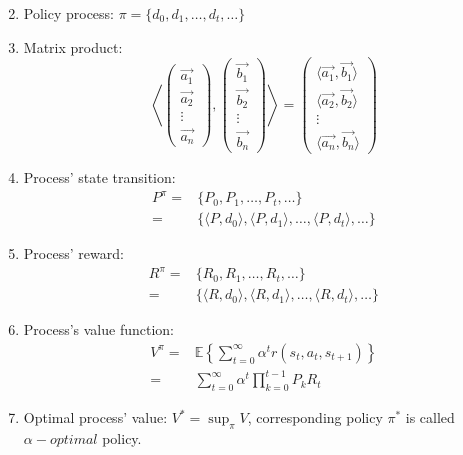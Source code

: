 \documentclass[a4paper]{article}
\numberwithin{figure}{section}
\numberwithin{equation}{section}
\begin{document}
\begin{enumerate}
\[        \]
    \item Policy process: $ \pi = \{ d_0, d_1, \ldots, d_t, \ldots \} $ 
    \item Matrix product:
        \[
            \left\langle 
                \begin{pmatrix}
                    \vec{a_1} \\
                    \vec{a_2} \\
                    \vdots \\
                    \vec{a_n}
                \end{pmatrix},
                \begin{pmatrix}
                    \vec{b_1} \\
                    \vec{b_2} \\
                    \vdots \\
                    \vec{b_n}
                \end{pmatrix}
            \right\rangle
            =
            \begin{pmatrix}
                \langle \vec{a_1}, \vec{b_1} \rangle \\
                \langle \vec{a_2}, \vec{b_2} \rangle \\
                \vdots \\
                \langle \vec{a_n}, \vec{b_n} \rangle
            \end{pmatrix}
        \]

    \item Process' state transition: 
        \begin{align*}
            P^{\pi} =& \{ P_0, P_1, \ldots, P_t, \ldots \} \\
            =& \{ \langle P, d_0 \rangle, \langle P, d_1 \rangle, \ldots, \langle P, d_t \rangle, \ldots \}
        \end{align*}
    \item Process' reward:
        \begin{align*}
            R^{\pi} =& \{ R_0, R_1, \ldots, R_t, \ldots \} \\
            =& \{ \langle R, d_0 \rangle, \langle R, d_1 \rangle, \ldots, \langle R, d_t \rangle, \ldots \}
        \end{align*}
    \item Process's value function:
        \begin{align*}
            V^{\pi} =& \mathbb{E} \left\{ \sum^{\infty}_{t=0} \alpha^t r(s_t, a_t, s_{t+1}) \right\} \\
            =& \sum^{\infty}_{t=0} \alpha^t \prod^{t-1}_{k=0}P_k R_t 
        \end{align*}
    \item Optimal process' value:
        $ V^* = \sup_{\pi} V $,
        corresponding policy $ \pi^* $ is called $ \alpha-optimal $ policy.
\end{enumerate}
    
\end{document}
